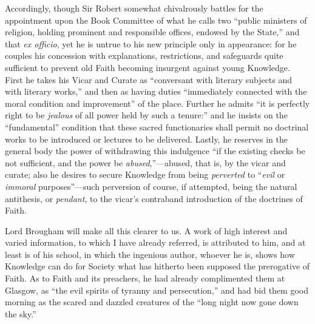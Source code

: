 Accordingly, though Sir Robert somewhat chivalrously battles for
the appointment upon the Book Committee of what he calls two
``public ministers of religion, holding prominent and responsible
offices, endowed by the State,'' and that \emph{ex officio}, yet
he is untrue to his new principle only in appearance: for he couples
his concession with explanations, restrictions, and safeguards quite
sufficient to prevent old Faith becoming insurgent against young
Knowledge. First he takes his Vicar and Curate as ``conversant
with literary subjects and with literary works,'' and then as
having duties ``immediately connected with the moral condition and
improvement'' of the place. Further he admits ``it is
perfectly right to be \emph{jealous} of all power held by such a
tenure:'' and he insists on the ``fundamental'' condition
that these sacred functionaries shall permit no doctrinal works to be
introduced or lectures to be delivered. Lastly, he reserves in the
general body the power of withdrawing this indulgence ``if the
existing checks be not sufficient, and the power be \emph{abused},''—abused,
that is, by the vicar and curate; also he desires to secure Knowledge
from being \emph{perverted} to ``\emph{evil} or \emph{immoral}
purposes''—such perversion of course, if attempted, being the
natural antithesis, or \emph{pendant}, to the vicar's contraband
introduction of the doctrines of Faith.

Lord Brougham will make all this clearer to us. A work of high
interest and varied information, to which I have already referred, is
attributed to him, and at least is of his school, in which the
ingenious author, whoever he is, shows how Knowledge can do for
Society what has hitherto been supposed the prerogative of Faith. As
to Faith and its preachers, he had already complimented them at
Glasgow, as ``the evil spirits of tyranny and persecution,''
and had bid them good morning as the scared and dazzled creatures of
the ``long night now gone down the sky.''

